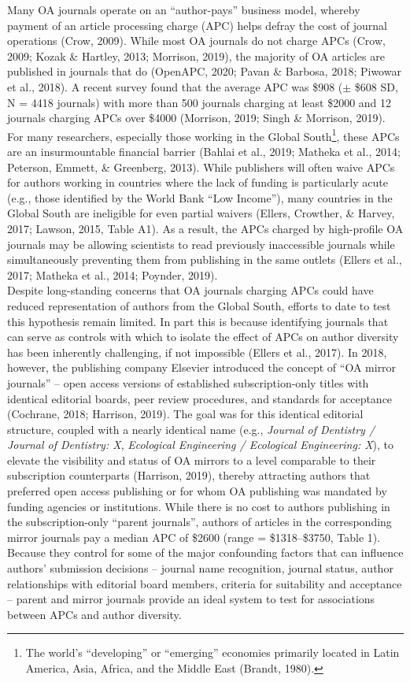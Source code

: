 \documentclass[
  english,
  man]{apa6}
\begin{document}
Many OA journals operate on an \enquote{author-pays} business model, whereby payment of an article processing charge (APC) helps defray the cost of journal operations (Crow, 2009). While most OA journals do not charge APCs (Crow, 2009; Kozak \& Hartley, 2013; Morrison, 2019), the majority of OA articles are published in journals that do (OpenAPC, 2020; Pavan \& Barbosa, 2018; Piwowar et al., 2018). A recent survey found that the average APC was \$908 (\(\pm\) \$608 SD, N = 4418 journals) with more than 500 journals charging at least \$2000 and 12 journals charging APCs over \$4000 (Morrison, 2019; Singh \& Morrison, 2019). For many researchers, especially those working in the Global South\footnote{The world's \enquote{developing} or \enquote{emerging} economies primarily located in Latin America, Asia, Africa, and the Middle East (Brandt, 1980).}, these APCs are an insurmountable financial barrier (Bahlai et al., 2019; Matheka et al., 2014; Peterson, Emmett, \& Greenberg, 2013). While publishers will often waive APCs for authors working in countries where the lack of funding is particularly acute (e.g., those identified by the World Bank \enquote{Low Income}), many countries in the Global South are ineligible for even partial waivers (Ellers, Crowther, \& Harvey, 2017; Lawson, 2015, Table A1). As a result, the APCs charged by high-profile OA journals may be allowing scientists to read previously inaccessible journals while simultaneously preventing them from publishing in the same outlets (Ellers et al., 2017; Matheka et al., 2014; Poynder, 2019).\\
Despite long-standing concerns that OA journals charging APCs could have reduced representation of authors from the Global South, efforts to date to test this hypothesis remain limited. In part this is because identifying journals that can serve as controls with which to isolate the effect of APCs on author diversity has been inherently challenging, if not impossible (Ellers et al., 2017). In 2018, however, the publishing company Elsevier introduced the concept of \enquote{OA mirror journals} -- open access versions of established subscription-only titles with identical editorial boards, peer review procedures, and standards for acceptance (Cochrane, 2018; Harrison, 2019). The goal was for this identical editorial structure, coupled with a nearly identical name (e.g., \emph{Journal of Dentistry / Journal of Dentistry: X}, \emph{Ecological Engineering / Ecological Engineering: X}), to elevate the visibility and status of OA mirrors to a level comparable to their subscription counterparts (Harrison, 2019), thereby attracting authors that preferred open access publishing or for whom OA publishing was mandated by funding agencies or institutions. While there is no cost to authors publishing in the subscription-only \enquote{parent journals}, authors of articles in the corresponding mirror journals pay a median APC of \$2600 (range = \$1318--\$3750, Table 1). Because they control for some of the major confounding factors that can influence authors' submission decisions -- journal name recognition, journal status, author relationships with editorial board members, criteria for suitability and acceptance -- parent and mirror journals provide an ideal system to test for associations between APCs and author diversity.\\
\end{document}
